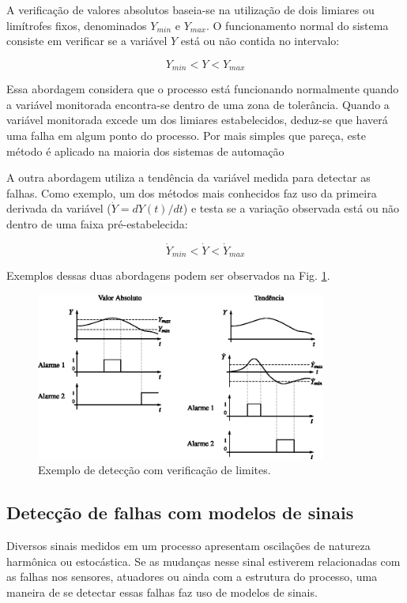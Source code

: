 A verificação de valores absolutos baseia-se na utilização de dois limiares ou
limítrofes fixos, denominados $Y_{min}$ e $Y_{max}$. O funcionamento normal do
sistema consiste em verificar se a variável $Y$ está ou não contida no
intervalo:

\begin{equation}
Y_{min} < Y < Y_{max}
\end{equation}

Essa abordagem considera que o processo está funcionando normalmente quando a
variável monitorada encontra-se dentro de uma zona de tolerância. Quando a
variável monitorada excede um dos limiares estabelecidos, deduz-se que haverá
uma falha em algum ponto do processo. Por mais simples que pareça, este método é
aplicado na maioria dos sistemas de automação

A outra abordagem utiliza a tendência da variável medida para detectar as
falhas. Como exemplo, um dos métodos mais conhecidos faz uso da primeira
derivada da variável ($\dot{Y} = dY(t)/dt$) e testa se a variação observada está
ou não dentro de uma faixa pré-estabelecida:

\begin{equation}
\dot{Y}_{min} < \dot{Y} < \dot{Y}_{max}
\end{equation}

Exemplos dessas duas abordagens podem ser observados na Fig.
\ref{fig:detec_ver_lim}.

\begin{figure}[htb]
\centering
    \includegraphics[width=0.85\textwidth]{imgs/detec_diag/eps/detec_ver_lim}
    \caption{Exemplo de detecção com verificação de limites.}
    \label{fig:detec_ver_lim}
\end{figure}

\subsection{Detecção de falhas com modelos de sinais}
Diversos sinais medidos em um processo apresentam oscilações de natureza
harmônica ou estocástica. Se as mudanças nesse sinal estiverem relacionadas com
as falhas nos sensores, atuadores ou ainda  com a estrutura do processo, uma
maneira de se detectar essas falhas faz uso de modelos de sinais.

